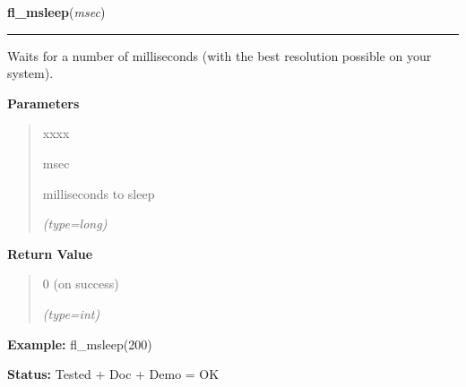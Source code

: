     \label{xformslib:flbasic:fl_msleep}

    \vspace{0.5ex}

\hspace{.8\funcindent}\begin{boxedminipage}{\funcwidth}

    \raggedright \textbf{fl\_msleep}(\textit{msec})

    \vspace{-1.5ex}

    \rule{\textwidth}{0.5\fboxrule}
\setlength{\parskip}{2ex}
    Waits for a number of milliseconds (with the best resolution possible 
    on your system).

\setlength{\parskip}{1ex}
      \textbf{Parameters}
      \vspace{-1ex}

      \begin{quote}
        \begin{Ventry}{xxxx}

          \item[msec]

          milliseconds to sleep

            {\it (type=long)}

        \end{Ventry}

      \end{quote}

      \textbf{Return Value}
    \vspace{-1ex}

      \begin{quote}
      0 (on success)

      {\it (type=int)}

      \end{quote}

\textbf{Example:} fl\_msleep(200)



\textbf{Status:} Tested + Doc + Demo = OK



    \end{boxedminipage}

    \label{xformslib:flbasic:fl_is_same_object}

